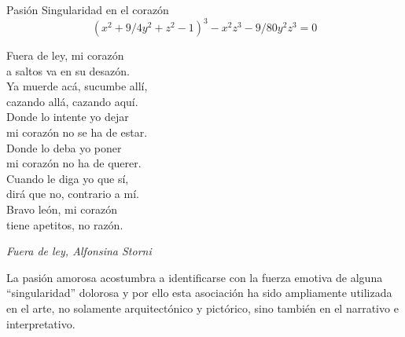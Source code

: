 \begin{surferPage}{Pasión}
Singularidad en el coraz\'on\\
\smallskip
\[(x^2+ 9/4y^2	+ z^2- 1)^3- x^2z^3	- 9/80y^2z^3	= 0\]

\singlespacing
Fuera de ley, mi coraz\'on\\a saltos va en su desaz\'on.\\
\vspace{0.3cm}
Ya muerde ac\'a, sucumbe all\'i,\\cazando all\'a, cazando aqu\'i.\\
\vspace{0.3cm}
Donde lo intente yo dejar\\mi coraz\'on no se ha de estar.\\
\vspace{0.3cm}
Donde lo deba yo poner\\mi coraz\'on no ha de querer.\\
\vspace{0.3cm}
Cuando le diga yo que s\'i,\\dir\'a que no, contrario a m\'i.\\
\vspace{0.3cm}
Bravo le\'on, mi coraz\'on\\tiene apetitos, no raz\'on.

\begin{flushright}
{\it Fuera de ley, Alfonsina Storni}
\end{flushright}

\singlespacing 
La pasi\'on amorosa acostumbra a identificarse con la fuerza emotiva de alguna ``singularidad'' dolorosa y por ello esta asociaci\'on ha sido ampliamente utilizada en el arte, no solamente arquitect\'onico y pict\'orico, sino tambi\'en en el narrativo e interpretativo.
\end{surferPage}
